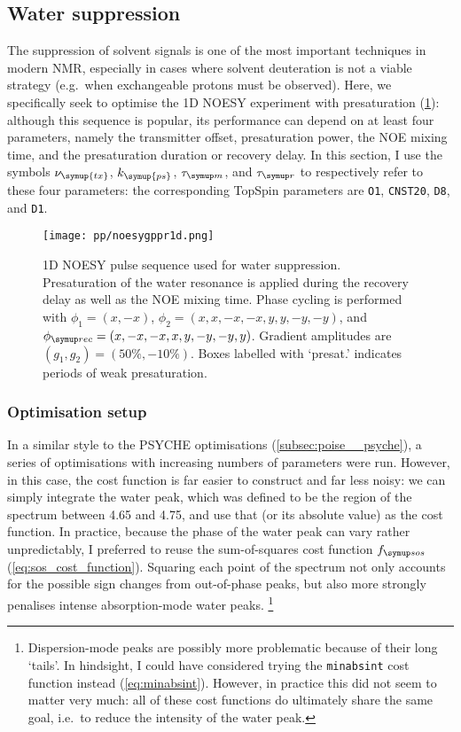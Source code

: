 \subsection{Water suppression}
\label{subsec:poise__solvsupp}

The suppression of solvent signals is one of the most important techniques in modern NMR, especially in cases where solvent deuteration is not a viable strategy (e.g.\ when exchangeable protons must be observed).\autocite{Hore1983JMR,Zheng2010PNMRS,Giraudeau2015M}
Here, we specifically seek to optimise the 1D NOESY experiment with presaturation\autocite{Mckay2011CMR} (\cref{fig:poise_solvsupp_pulseq}): although this sequence is popular, its performance can depend on at least four parameters, namely the transmitter offset, presaturation power, the NOE mixing time, and the presaturation duration or recovery delay.
In this section, I use the symbols $\nu_{\symup{tx}}$, $k_{\symup{ps}}$, $\taum$, and $\taur$ to respectively refer to these four parameters: the corresponding TopSpin parameters are \texttt{O1}, \texttt{CNST20}, \texttt{D8}, and \texttt{D1}.

\begin{figure}[htb]
    \centering
    \texttt{[image: pp/noesygppr1d.png]}%
    \caption[1D NOESY pulse sequence for water suppression]{
        1D NOESY pulse sequence used for water suppression.
        Presaturation of the water resonance is applied during the recovery delay as well as the NOE mixing time.
        Phase cycling is performed with $\phi_1 = (x, -x)$, $\phi_2 = (x, x, -x, -x, y, y, -y, -y)$, and $\phirec = (x, -x, -x, x, y, -y, -y, y)$.
        Gradient amplitudes are $(g_1, g_2) = (50\%, -10\%)$.
        Boxes labelled with `presat.' indicates periods of weak presaturation.
    }
    \label{fig:poise_solvsupp_pulseq}
\end{figure}


\subsubsection{Optimisation setup}

In a similar style to the PSYCHE optimisations (\cref{subsec:poise__psyche}), a series of optimisations with increasing numbers of parameters were run.
However, in this case, the cost function is far easier to construct and far less noisy: we can simply integrate the water peak, which was defined to be the region of the spectrum between 4.65 and \qty{4.75}{\ppm}, and use that (or its absolute value) as the cost function.
In practice, because the phase of the water peak can vary rather unpredictably, I preferred to reuse the sum-of-squares cost function $\fsos$ (\cref{eq:sos_cost_function}).
Squaring each point of the spectrum not only accounts for the possible sign changes from out-of-phase peaks, but also more strongly penalises intense absorption-mode water peaks.%
\footnote{Dispersion-mode peaks are possibly more problematic because of their long `tails'. In hindsight, I could have considered trying the \texttt{minabsint} cost function instead (\cref{eq:minabsint}). However, in practice this did not seem to matter very much: all of these cost functions do ultimately share the same goal, i.e.\ to reduce the intensity of the water peak.}

